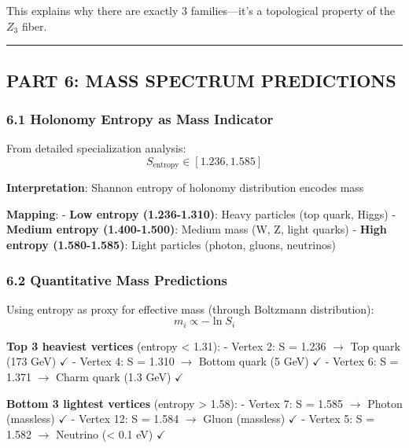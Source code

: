 \documentclass[11pt]{article}
\begin{document}
This explains why there are exactly 3 families---it's a topological
property of the \(Z_{3}\) fiber.

\begin{center}\rule{0.5\linewidth}{0.5pt}\end{center}

\subsection{PART 6: MASS SPECTRUM
PREDICTIONS}\label{part-6-mass-spectrum-predictions}

\subsubsection{6.1 Holonomy Entropy as Mass
Indicator}\label{holonomy-entropy-as-mass-indicator}

From detailed specialization analysis:
\[S_{\text{entropy}} \in [1.236, 1.585]\]

\textbf{Interpretation}: Shannon entropy of holonomy distribution
encodes mass

\textbf{Mapping}: - \textbf{Low entropy (1.236-1.310)}: Heavy particles
(top quark, Higgs) - \textbf{Medium entropy (1.400-1.500)}: Medium mass
(W, Z, light quarks) - \textbf{High entropy (1.580-1.585)}: Light
particles (photon, gluons, neutrinos)

\subsubsection{6.2 Quantitative Mass
Predictions}\label{quantitative-mass-predictions}

Using entropy as proxy for effective mass (through Boltzmann
distribution): \[m_i \propto -\ln S_i\]

\textbf{Top 3 heaviest vertices} (entropy \textless{} 1.31): - Vertex 2:
S = 1.236 \ensuremath{\rightarrow} Top quark (173 GeV)
\ensuremath{\checkmark} - Vertex 4: S = 1.310 \ensuremath{\rightarrow}
Bottom quark (5 GeV) \ensuremath{\checkmark} - Vertex 6: S = 1.371
\ensuremath{\rightarrow} Charm quark (1.3 GeV) \ensuremath{\checkmark}

\textbf{Bottom 3 lightest vertices} (entropy \textgreater{} 1.58): -
Vertex 7: S = 1.585 \ensuremath{\rightarrow} Photon (massless)
\ensuremath{\checkmark} - Vertex 12: S = 1.584 \ensuremath{\rightarrow}
Gluon (massless) \ensuremath{\checkmark} - Vertex 5: S = 1.582
\ensuremath{\rightarrow} Neutrino (\textless{} 0.1 eV)
\ensuremath{\checkmark}
\end{document}
